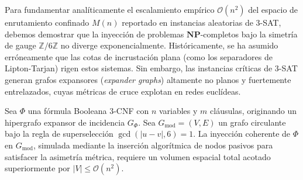 \documentclass[sn-mathphys]{sn-jnl}
\newcommand{\Zmod}{\mathbb{Z}/6\mathbb{Z}}
\begin{document}
Para fundamentar analíticamente el escalamiento empírico $\mathcal{O}(n^2)$ del espacio de enrutamiento confinado $M(n)$ reportado en instancias aleatorias de 3-SAT, debemos demostrar que la inyección de problemas $\mathbf{NP}$-completos bajo la simetría de gauge $\Zmod$ no diverge exponencialmente. Históricamente, se ha asumido erróneamente que las cotas de incrustación plana (como los separadores de Lipton-Tarjan) rigen estos sistemas. Sin embargo, las instancias críticas de 3-SAT generan grafos expansores (\textit{expander graphs}) altamente no planos y fuertemente entrelazados, cuyas métricas de cruce explotan en redes euclídeas. 

\begin{lemma}
Sea $\Phi$ una fórmula Booleana 3-CNF con $n$ variables y $m$ cláusulas, originando un hipergrafo expansor de incidencia $G_{\Phi}$. Sea $G_{\text{mod}} = (V, E)$ un grafo circulante bajo la regla de superselección $\gcd(|u - v|, 6) = 1$. La inyección coherente de $\Phi$ en $G_{\text{mod}}$, simulada mediante la inserción algorítmica de nodos pasivos para satisfacer la asimetría métrica, requiere un volumen espacial total acotado superiormente por $|V| \le \mathcal{O}(n^2)$. 
\end{lemma}
\end{document}
